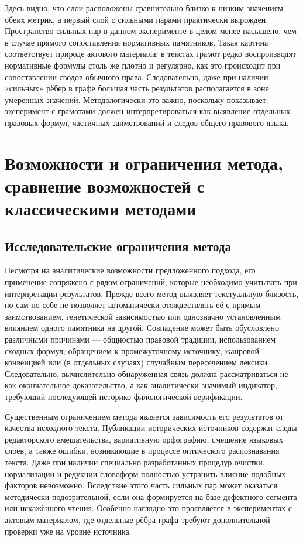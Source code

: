 Здесь видно, что слои расположены сравнительно близко к низким значениям обеих метрик, а первый слой с сильными парами практически вырожден. Пространство сильных пар в данном эксперименте в целом менее насыщено, чем в случае прямого сопоставления нормативных памятников. Такая картина соответствует природе актового материала: в текстах грамот редко воспроизводят нормативные формулы столь же плотно и регулярно, как это происходит при сопоставлении сводов обычного права. Следовательно, даже при наличии «сильных» рёбер в графе большая часть результатов располагается в зоне умеренных значений. Методологически это важно, поскольку показывает: эксперимент с грамотами должен интерпретироваться как выявление отдельных правовых формул, частичных заимствований и следов общего правового языка.

\section{Возможности и ограничения метода, сравнение возможностей с классическими методами}

\subsection{Исследовательские ограничения метода}

Несмотря на аналитические возможности предложенного подхода, его применение сопряжено с рядом ограничений, которые необходимо учитывать при интерпретации результатов. Прежде всего метод выявляет текстуальную близость, но сам по себе не позволяет автоматически отождествлять её с прямым заимствованием, генетической зависимостью или однозначно установленным влиянием одного памятника на другой. Совпадение может быть обусловлено различными причинами --- общностью правовой традиции, использованием сходных формул, обращением к промежуточному источнику, жанровой конвенцией или (в отдельных случаях) случайным пересечением лексики. Следовательно, вычислительно обнаруженная связь должна рассматриваться не как окончательное доказательство, а как аналитически значимый индикатор, требующий последующей историко-филологической верификации.

Существенным ограничением метода является зависимость его результатов от качества исходного текста. Публикации исторических источников содержат следы редакторского вмешательства, вариативную орфографию, смешение языковых слоёв, а также ошибки, возникающие в процессе оптического распознавания текста. Даже при наличии специально разработанных процедур очистки, нормализации и редукции словоформ полностью устранить влияние подобных факторов невозможно. Вследствие этого часть сильных пар может оказаться методически подозрительной, если она формируется на базе дефектного сегмента или искажённого чтения. Особенно наглядно это проявляется в экспериментах с актовым материалом, где отдельные рёбра графа требуют дополнительной проверки уже на уровне источника.

